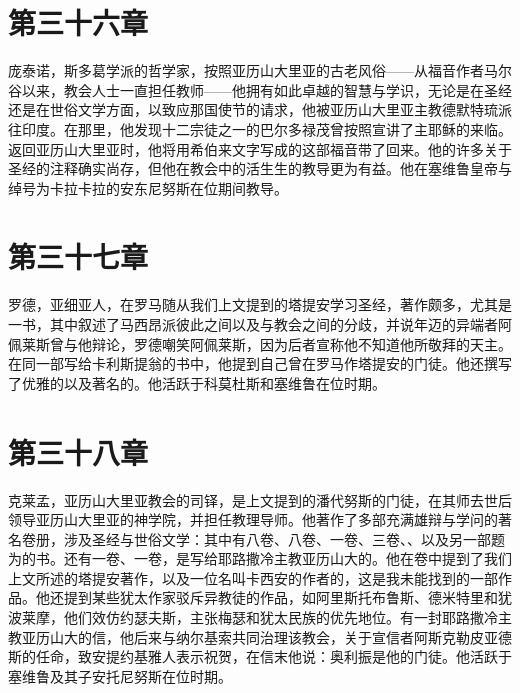 
\section{第三十六章}

庞泰诺，斯多葛学派的哲学家，按照亚历山大里亚的古老风俗——从福音作者马尔谷以来，教会人士一直担任教师——他拥有如此卓越的智慧与学识，无论是在圣经还是在世俗文学方面，以致应那国使节的请求，他被亚历山大里亚主教德默特琉派往印度。在那里，他发现十二宗徒之一的巴尔多禄茂曾按照宣讲了主耶稣的来临。返回亚历山大里亚时，他将用希伯来文字写成的这部福音带了回来。他的许多关于圣经的注释确实尚存，但他在教会中的活生生的教导更为有益。他在塞维鲁皇帝与绰号为卡拉卡拉的安东尼努斯在位期间教导。\newline{}\par


\section{第三十七章}

罗德，亚细亚人，在罗马随从我们上文提到的塔提安学习圣经，著作颇多，尤其是一书，其中叙述了马西昂派彼此之间以及与教会之间的分歧，并说年迈的异端者阿佩莱斯曾与他辩论，罗德嘲笑阿佩莱斯，因为后者宣称他不知道他所敬拜的天主。在同一部写给卡利斯提翁的书中，他提到自己曾在罗马作塔提安的门徒。他还撰写了优雅的以及著名的。他活跃于科莫杜斯和塞维鲁在位时期。\par


\section{第三十八章}

克莱孟，亚历山大里亚教会的司铎，是上文提到的潘代努斯的门徒，在其师去世后领导亚历山大里亚的神学院，并担任教理导师。他著作了多部充满雄辩与学问的著名卷册，涉及圣经与世俗文学：其中有八卷、八卷、一卷、三卷、、以及另一部题为的书。还有一卷、一卷，是写给耶路撒冷主教亚历山大的。他在卷中提到了我们上文所述的塔提安著作，以及一位名叫卡西安的作者的，这是我未能找到的一部作品。他还提到某些犹太作家驳斥异教徒的作品，如阿里斯托布鲁斯、德米特里和犹波莱摩，他们效仿约瑟夫斯，主张梅瑟和犹太民族的优先地位。有一封耶路撒冷主教亚历山大的信，他后来与纳尔基索共同治理该教会，关于宣信者阿斯克勒皮亚德斯的任命，致安提约基雅人表示祝贺，在信末他说：奥利振是他的门徒。他活跃于塞维鲁及其子安托尼努斯在位时期。\par

